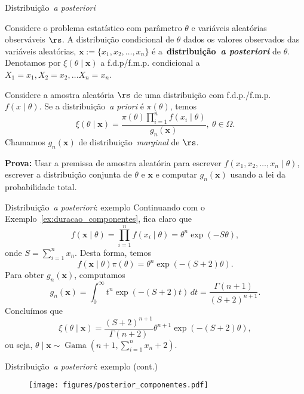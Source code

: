 \begin{frame}{Distribuição~\textit{a posteriori}}
\begin{defn}
 \label{def:posterior}
 Considere o problema estatístico com parâmetro $\theta$ e variáveis aleatórias observáveis $\rs$.
 A distribuição condicional de $\theta$ dados os valores observados das variáveis aleatórias, $\boldsymbol x := \{x_1, x_2, \ldots, x_n \}$ é a~\textbf{distribuição~\textit{a posteriori}} de $\theta$.
 Denotamos por $\xi(\theta \mid \boldsymbol x)$ a f.d.p/f.m.p. condicional a $X_1 = x_1, X_2 = x_2, \ldots X_n = x_n$.
\end{defn}
\begin{theo}
 \label{thm:posterior_distribution}
 Considere a amostra aleatória $\rs$ de uma distribuição com f.d.p./f.m.p. $f(x\mid\theta)$.
 Se a distribuição~\textit{a priori} é $\pi(\theta)$, temos
 \begin{equation}
  \label{eq:posterior}
    \xi(\theta \mid \boldsymbol x) = \frac{\pi(\theta)\prod_{i=1}^n f(x_i \mid \theta)}{g_n(\boldsymbol x)}, \: \theta \in \Omega.  
 \end{equation}
 Chamamos $g_n(\boldsymbol x)$ de distribuição~\textit{marginal} de $\rs$.
\end{theo}
\textbf{Prova:} Usar a premissa de amostra aleatória para escrever $f(x_1, x_2, \ldots, x_n \mid \theta)$, escrever a distribuição conjunta de $\theta$ e $\boldsymbol x$ e computar $g_n(\boldsymbol x)$ usando a lei da probabilidade total. 
\end{frame}
\begin{frame}{Distribuição~\textit{a posteriori}: exemplo}
Continuando com o Exemplo~\ref{ex:duracao_componentes}, fica claro que 
 \[f (\boldsymbol x  \mid \theta) = \prod_{i=1}^n f(x_i \mid \theta) = \theta^n\exp(-S\theta), \]
onde $S = \sum_{i = 1}^n x_n$.
Desta forma, temos 
\[ f (\boldsymbol x  \mid \theta)\pi(\theta) = \theta^{n}\exp(-(S + 2)\theta).\]
Para obter $g_n(\boldsymbol{x})$, computamos 
\[ g_n(\boldsymbol{x}) = \int_0^\infty t^{n}\exp(-(S + 2)t) \,dt = \frac{\Gamma( n + 1) }{ (S + 2)^{n + 1}}. \]
Concluímos que 
\[\xi(\theta \mid \boldsymbol{x}) = \frac{(S + 2)^{n + 1}}{\Gamma( n + 2)} \theta^{n+1}\exp(-(S + 2)\theta),  \]
ou seja, $\theta \mid \boldsymbol{x} \sim \operatorname{Gama}(n + 1, \sum_{i = 1}^n x_n + 2)$.
\end{frame}
\begin{frame}{Distribuição~\textit{a posteriori}: exemplo (cont.)}
    \begin{figure}[!ht]
    \label{fig:posterior_componentes}
    \begin{center}
    \texttt{[image: figures/posterior\_componentes.pdf]} 
    \end{center} 
    \end{figure} 
\end{frame}
